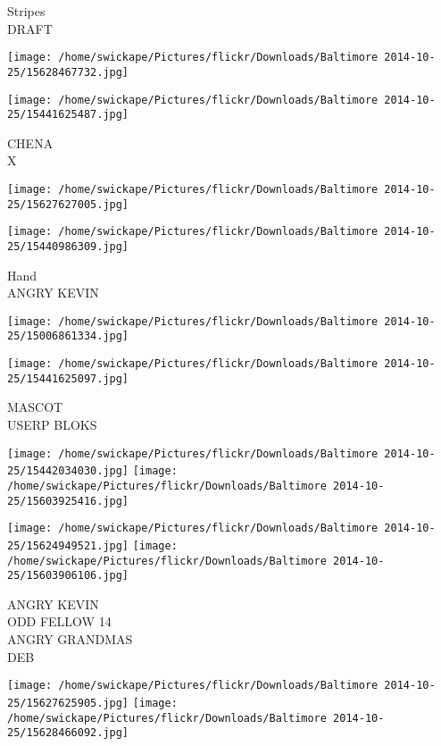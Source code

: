\documentclass[10pt,letterpaper]{article}
\begin{document}
Stripes\\
DRAFT\\
\pagebreak

\texttt{[image: /home/swickape/Pictures/flickr/Downloads/Baltimore 2014-10-25/15628467732.jpg]}

\vspace{0.25in}
\texttt{[image: /home/swickape/Pictures/flickr/Downloads/Baltimore 2014-10-25/15441625487.jpg]}

CHENA\\
X\\
\pagebreak

\texttt{[image: /home/swickape/Pictures/flickr/Downloads/Baltimore 2014-10-25/15627627005.jpg]}

\vspace{0.25in}
\texttt{[image: /home/swickape/Pictures/flickr/Downloads/Baltimore 2014-10-25/15440986309.jpg]}

Hand\\
ANGRY KEVIN\\
\pagebreak

\texttt{[image: /home/swickape/Pictures/flickr/Downloads/Baltimore 2014-10-25/15006861334.jpg]}

\vspace{0.25in}
\texttt{[image: /home/swickape/Pictures/flickr/Downloads/Baltimore 2014-10-25/15441625097.jpg]}

MASCOT\\
USERP BLOKS\\
\pagebreak

\texttt{[image: /home/swickape/Pictures/flickr/Downloads/Baltimore 2014-10-25/15442034030.jpg]}
\texttt{[image: /home/swickape/Pictures/flickr/Downloads/Baltimore 2014-10-25/15603925416.jpg]}

\texttt{[image: /home/swickape/Pictures/flickr/Downloads/Baltimore 2014-10-25/15624949521.jpg]}
\texttt{[image: /home/swickape/Pictures/flickr/Downloads/Baltimore 2014-10-25/15603906106.jpg]}

ANGRY KEVIN\\
ODD FELLOW 14\\
ANGRY GRANDMAS\\
DEB\\
\pagebreak

\texttt{[image: /home/swickape/Pictures/flickr/Downloads/Baltimore 2014-10-25/15627625905.jpg]}
\texttt{[image: /home/swickape/Pictures/flickr/Downloads/Baltimore 2014-10-25/15628466092.jpg]}
\end{document}

